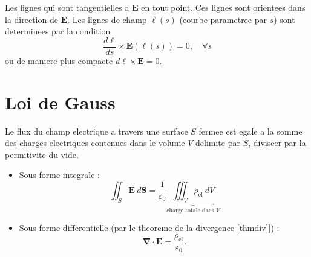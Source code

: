 Les lignes qui sont tangentielles a $\boldsymbol{E}$ en tout point. Ces lignes sont orientees dans la direction de $\boldsymbol{E}$. 
Les lignes de champ $\boldsymbol{\ell}(s)$ (courbe parametree par $s$) sont determinees par la condition
$$
\frac{d\boldsymbol{\ell}}{ds}\times \boldsymbol{E}(\boldsymbol{\ell}(s))=0,\quad \forall s
$$
ou de maniere plus compacte $d\boldsymbol{\ell}\times \boldsymbol{E}=0$.

\section{Loi de Gauss}

\begin{theorem}
Le flux du champ electrique a travers une surface $S$ fermee est egale a la somme des charges electriques contenues dans le volume $V$ delimite par $S$, diviseer par la permitivite du vide.
\begin{itemize}
\item Sous forme integrale : 
$$
\iint _{S} \boldsymbol{E}~d\boldsymbol{S}=\frac{1}{\varepsilon_{0}}\underbrace{ \iiint _{V} \rho _{\mathrm{el}} ~dV }_{ \text{charge totale dans }V }
$$
\item Sous forme differentielle (par le theoreme de la divergence \ref{thmdiv}]) : 
$$  
\boldsymbol{\nabla \cdot E}=\frac{\rho _{\mathrm{el}}}{\varepsilon _{0}}.
$$
\end{itemize}
\end{theorem}